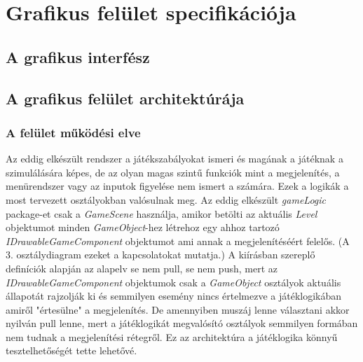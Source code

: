 


\setcounter{section}{10}




\fedlap

\section{Grafikus felület specifikációja}

\subsection{A grafikus interfész}

\subsection{A grafikus felület architektúrája}

\subsubsection{A felület működési elve}

Az eddig elkészült rendszer a játékszabályokat ismeri és magának a játéknak a szimulálására képes, de az olyan magas szintű funkciók mint a megjelenítés, a menürendszer vagy az inputok figyelése nem ismert a számára. Ezek a logikák a most tervezett osztályokban valósulnak meg. Az eddig elkészült \emph{gameLogic} package-et csak a \emph{GameScene} használja, amikor betölti az aktuális \emph{Level} objektumot minden \emph{GameObject}-hez létrehoz egy ahhoz tartozó \emph{IDrawableGameComponent} objektumot ami annak a megjelenítéséért felelős. (A 3. osztálydiagram ezeket a kapcsolatokat mutatja.) A kiírásban szereplő definíciók alapján az alapelv se nem pull, se nem push, mert az \emph{IDrawableGameComponent} objektumok csak a \emph{GameObject} osztályok aktuális állapotát rajzolják ki és semmilyen esemény nincs értelmezve a játéklogikában amiről "értesülne" a megjelenítés. De amennyiben muszáj lenne választani akkor nyilván pull lenne, mert a játéklogikát megvalósító osztályok semmilyen formában nem tudnak a megjelenítési rétegről. Ez az architektúra a játéklogika könnyű tesztelhetőségét tette lehetővé.


